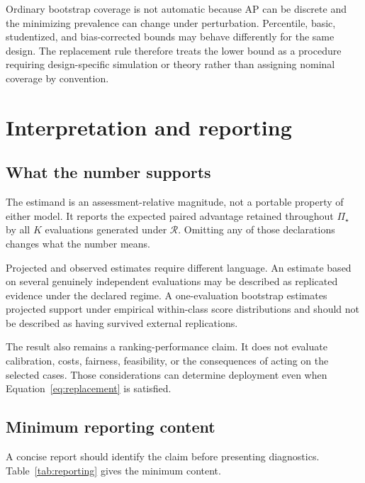 \documentclass[11pt]{article}
\newcommand{\Regime}{\mathcal{R}}
\newcommand{\PSet}{\Pi_\star}
\theoremstyle{remark}
\begin{document}
Ordinary bootstrap coverage is not automatic because AP can be discrete and the minimizing prevalence can change under perturbation. Percentile, basic, studentized, and bias-corrected bounds may behave differently for the same design. The replacement rule therefore treats the lower bound as a procedure requiring design-specific simulation or theory rather than assigning nominal coverage by convention.

\section{Interpretation and reporting}
\label{sec:discussion}

\subsection{What the number supports}

The estimand is an assessment-relative magnitude, not a portable property of either model. It reports the expected paired advantage retained throughout $\PSet$ by all $K$ evaluations generated under $\Regime$. Omitting any of those declarations changes what the number means.

Projected and observed estimates require different language. An estimate based on several genuinely independent evaluations may be described as replicated evidence under the declared regime. A one-evaluation bootstrap estimates projected support under empirical within-class score distributions and should not be described as having survived external replications.

The result also remains a ranking-performance claim. It does not evaluate calibration, costs, fairness, feasibility, or the consequences of acting on the selected cases. Those considerations can determine deployment even when Equation~\eqref{eq:replacement} is satisfied.

\subsection{Minimum reporting content}

A concise report should identify the claim before presenting diagnostics. Table~\ref{tab:reporting} gives the minimum content.
\end{document}
